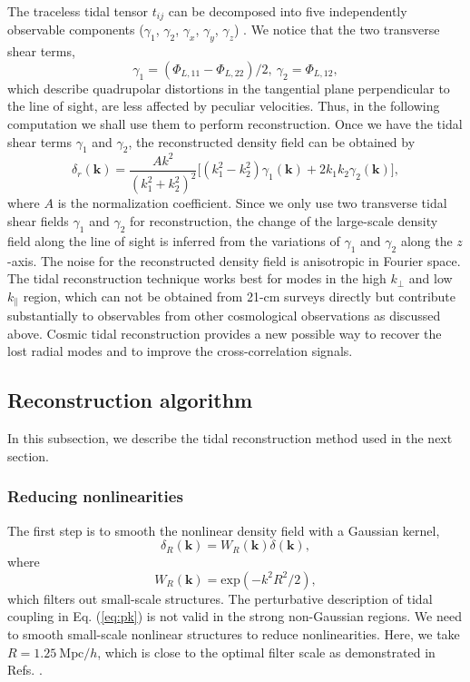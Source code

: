 \documentclass[prd,superscriptaddress,floatfix,notitlepage,nofootinbib,reprint]{revtex4-1}
\newcommand{\mr}{\mathrm}
\newcommand{\kpa}{k_\parallel}
\newcommand{\kpe}{k_\perp}
\newcommand{\bmk}{\bm{k}}
\newcommand{\bea}{\begin{equation}}
\newcommand{\eea}{\end{equation}}
\begin{document}
The traceless tidal tensor $t_{ij}$ can be decomposed into five independently 
observable components ($\gamma_1$, $\gamma_2$, $\gamma_x$, $\gamma_y$, 
$\gamma_z$) \cite{2016Tides}.
We notice that the two transverse shear terms, 
\bea
\gamma_1=(\Phi_{L,11}-\Phi_{L,22})/2,\ \gamma_2=\Phi_{L,12},
\eea
which describe quadrupolar distortions in the tangential plane perpendicular 
to the line of sight, are less affected by peculiar velocities.
Thus, in the following computation we shall use them to perform reconstruction.
Once we have the tidal shear terms $\gamma_1$ and $\gamma_2$, the reconstructed
density field can be obtained by
\bea
\label{eq:rec}
\delta_r(\bmk)=\frac{Ak^2}{(k_1^2+k_2^2)^2}\bigg[(k_1^2-k_2^2)\gamma_1(\bmk)+2k_1k_2\gamma_2(\bmk)\bigg],
\eea
where $A$ is the normalization coefficient.
Since we only use two transverse tidal shear fields $\gamma_1$ and $\gamma_2$
for reconstruction, the change of the large-scale density field along the line 
of sight is inferred from the variations of $\gamma_1$ and $\gamma_2$ along 
the $z$-axis. 
The noise for the reconstructed density field is anisotropic in Fourier space.
The tidal reconstruction technique works best for modes in the high $\kpe$ 
and low $\kpa$ region, which can not be obtained from 21-cm surveys directly 
but contribute substantially to observables from other cosmological observations
as discussed above. Cosmic tidal reconstruction provides a new possible way 
to recover the lost radial modes and to improve the cross-correlation signals.

\subsection{Reconstruction algorithm}
In this subsection, we describe the tidal reconstruction method used in the 
next section.

\subsubsection{Reducing nonlinearities}

The first step is to smooth the nonlinear density field with a Gaussian kernel, 
\bea
\delta_R(\bmk)=W_R(\bmk)\delta(\bmk),
\eea
where 
\bea
W_R(\bm{k})=\mr{exp}(-k^2R^2/2),
\eea
which filters out small-scale structures.
The perturbative description of tidal coupling in Eq. (\ref{eq:pk}) is not valid
in the strong non-Gaussian regions. 
We need to smooth small-scale nonlinear structures to reduce nonlinearities.
Here, we take $R=1.25\ \mr{Mpc}/h$, which is close to the optimal filter scale
as demonstrated in Refs. \cite{2012Tides,2016Tides}.  
\end{document}
